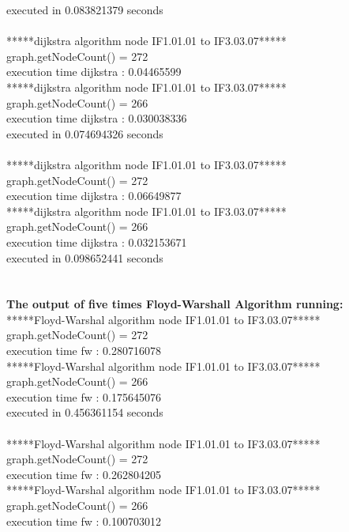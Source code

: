 executed in 0.083821379 seconds\\
\\
*****dijkstra algorithm node IF1.01.01 to IF3.03.07*****\\
graph.getNodeCount() = 272\\
execution time dijkstra : 0.04465599\\
*****dijkstra algorithm node IF1.01.01 to IF3.03.07*****\\
graph.getNodeCount() = 266\\
execution time dijkstra : 0.030038336\\
executed in 0.074694326 seconds\\
\\
*****dijkstra algorithm node IF1.01.01 to IF3.03.07*****\\
graph.getNodeCount() = 272\\
execution time dijkstra : 0.06649877\\
*****dijkstra algorithm node IF1.01.01 to IF3.03.07*****\\
graph.getNodeCount() = 266\\
execution time dijkstra : 0.032153671\\
executed in 0.098652441 seconds\\
\\\\
\textbf{The output of five times Floyd-Warshall Algorithm running:}\\
*****Floyd-Warshal algorithm node IF1.01.01 to IF3.03.07*****\\
graph.getNodeCount() = 272\\
execution time fw : 0.280716078\\
*****Floyd-Warshal algorithm node IF1.01.01 to IF3.03.07*****\\
graph.getNodeCount() = 266\\
execution time fw : 0.175645076\\
executed in 0.456361154 seconds\\
\\
*****Floyd-Warshal algorithm node IF1.01.01 to IF3.03.07*****\\
graph.getNodeCount() = 272\\
execution time fw : 0.262804205\\
*****Floyd-Warshal algorithm node IF1.01.01 to IF3.03.07*****\\
graph.getNodeCount() = 266\\
execution time fw : 0.100703012\\
